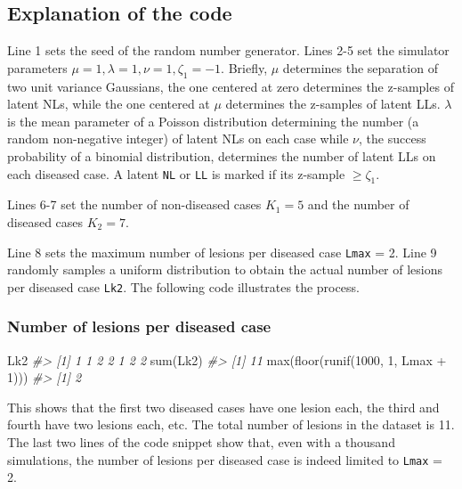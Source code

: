 \documentclass[
]{book}
\newenvironment{Shaded}{\begin{snugshade}}{\end{snugshade}}
\newcommand{\CommentTok}[1]{\textcolor[rgb]{0.56,0.35,0.01}{\textit{#1}}}
\newcommand{\DecValTok}[1]{\textcolor[rgb]{0.00,0.00,0.81}{#1}}
\newcommand{\FunctionTok}[1]{\textcolor[rgb]{0.00,0.00,0.00}{#1}}
\newcommand{\NormalTok}[1]{#1}
\newcommand{\SpecialCharTok}[1]{\textcolor[rgb]{0.00,0.00,0.00}{#1}}
\begin{document}
\hypertarget{explanation-of-the-code}{%
\subsection{Explanation of the code}\label{explanation-of-the-code}}

Line 1 sets the seed of the random number generator. Lines 2-5 set the simulator parameters \(\mu = 1, \lambda = 1, \nu = 1, \zeta_1 = -1\). Briefly, \(\mu\) determines the separation of two unit variance Gaussians, the one centered at zero determines the z-samples of latent NLs, while the one centered at \(\mu\) determines the z-samples of latent LLs. \(\lambda\) is the mean parameter of a Poisson distribution determining the number (a random non-negative integer) of latent NLs on each case while \(\nu\), the success probability of a binomial distribution, determines the number of latent LLs on each diseased case. A latent \texttt{NL} or \texttt{LL} is marked if its z-sample \(\geq \zeta_1\).

Lines 6-7 set the number of non-diseased cases \(K_1 = 5\) and the number of diseased cases \(K_2 = 7\).

Line 8 sets the maximum number of lesions per diseased case \texttt{Lmax} = 2. Line 9 randomly samples a uniform distribution to obtain the actual number of lesions per diseased case \texttt{Lk2}. The following code illustrates the process.

\hypertarget{number-of-lesions-per-diseased-case}{%
\subsubsection{Number of lesions per diseased case}\label{number-of-lesions-per-diseased-case}}

\begin{Shaded}
\begin{Highlighting}[]
\NormalTok{Lk2}
\CommentTok{\#\textgreater{} [1] 1 1 2 2 1 2 2}
\FunctionTok{sum}\NormalTok{(Lk2)}
\CommentTok{\#\textgreater{} [1] 11}
\FunctionTok{max}\NormalTok{(}\FunctionTok{floor}\NormalTok{(}\FunctionTok{runif}\NormalTok{(}\DecValTok{1000}\NormalTok{, }\DecValTok{1}\NormalTok{, Lmax }\SpecialCharTok{+} \DecValTok{1}\NormalTok{)))}
\CommentTok{\#\textgreater{} [1] 2}
\end{Highlighting}
\end{Shaded}

This shows that the first two diseased cases have one lesion each, the third and fourth have two lesions each, etc. The total number of lesions in the dataset is 11. The last two lines of the code snippet show that, even with a thousand simulations, the number of lesions per diseased case is indeed limited to \texttt{Lmax} = 2.
\end{document}
